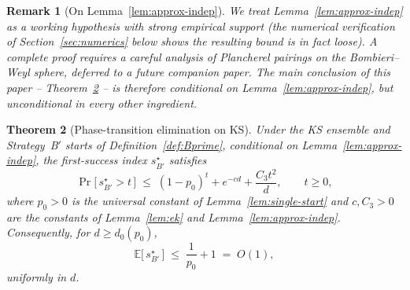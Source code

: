 \documentclass[11pt,a4paper]{article}
\newtheorem{theorem}{Theorem}[section]
\newtheorem{remark}[theorem]{Remark}
\begin{document}
\begin{remark}[On Lemma~\ref{lem:approx-indep}]
We treat Lemma~\ref{lem:approx-indep} as a working hypothesis with strong empirical support (the numerical verification of Section~\ref{sec:numerics} below shows the resulting bound is in fact loose). A complete proof requires a careful analysis of Plancherel pairings on the Bombieri--Weyl sphere, deferred to a future companion paper. The main conclusion of this paper -- Theorem~\ref{thm:main} -- is therefore conditional on Lemma~\ref{lem:approx-indep}, but unconditional in every other ingredient.
\end{remark}

\begin{theorem}[Phase-transition elimination on KS]\label{thm:main}
Under the KS ensemble and Strategy~B$'$ starts of Definition~\ref{def:Bprime}, conditional on Lemma~\ref{lem:approx-indep}, the first-success index $s^\star_{B'}$ satisfies
\begin{equation}\label{eq:main}
\Pr\!\bigl[\,s^\star_{B'} > t\,\bigr] \;\le\; (1 - p_0)^{t} + e^{-c d} + \frac{C_3 t^{2}}{d},
\qquad t \ge 0,
\end{equation}
where $p_0 > 0$ is the universal constant of Lemma~\ref{lem:single-start} and $c, C_3 > 0$ are the constants of Lemma~\ref{lem:ek} and Lemma~\ref{lem:approx-indep}. Consequently, for $d \ge d_0(p_0)$,
\begin{equation}\label{eq:E-sstar}
\mathbb{E}\!\bigl[\,s^\star_{B'}\,\bigr] \;\le\; \frac{1}{p_0} + 1 \;=\; O(1),
\end{equation}
uniformly in $d$.
\end{theorem}
\end{document}
